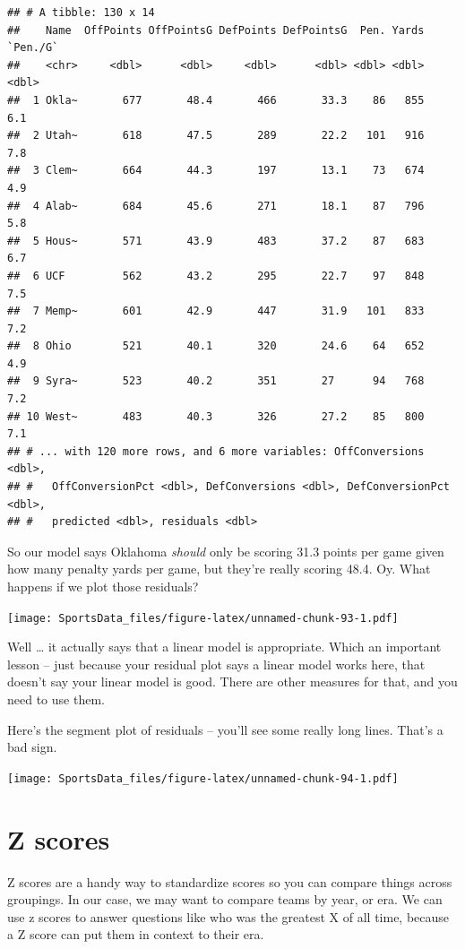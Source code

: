 \documentclass[]{book}
\begin{document}
\begin{verbatim}
## # A tibble: 130 x 14
##    Name  OffPoints OffPointsG DefPoints DefPointsG  Pen. Yards `Pen./G`
##    <chr>     <dbl>      <dbl>     <dbl>      <dbl> <dbl> <dbl>    <dbl>
##  1 Okla~       677       48.4       466       33.3    86   855      6.1
##  2 Utah~       618       47.5       289       22.2   101   916      7.8
##  3 Clem~       664       44.3       197       13.1    73   674      4.9
##  4 Alab~       684       45.6       271       18.1    87   796      5.8
##  5 Hous~       571       43.9       483       37.2    87   683      6.7
##  6 UCF         562       43.2       295       22.7    97   848      7.5
##  7 Memp~       601       42.9       447       31.9   101   833      7.2
##  8 Ohio        521       40.1       320       24.6    64   652      4.9
##  9 Syra~       523       40.2       351       27      94   768      7.2
## 10 West~       483       40.3       326       27.2    85   800      7.1
## # ... with 120 more rows, and 6 more variables: OffConversions <dbl>,
## #   OffConversionPct <dbl>, DefConversions <dbl>, DefConversionPct <dbl>,
## #   predicted <dbl>, residuals <dbl>
\end{verbatim}

So our model says Oklahoma \emph{should} only be scoring 31.3 points per
game given how many penalty yards per game, but they're really scoring
48.4. Oy. What happens if we plot those residuals?

\texttt{[image: SportsData\_files/figure-latex/unnamed-chunk-93-1.pdf]}

Well \ldots{} it actually says that a linear model is appropriate. Which
an important lesson -- just because your residual plot says a linear
model works here, that doesn't say your linear model is good. There are
other measures for that, and you need to use them.

Here's the segment plot of residuals -- you'll see some really long
lines. That's a bad sign.

\texttt{[image: SportsData\_files/figure-latex/unnamed-chunk-94-1.pdf]}

\chapter{Z scores}\label{z-scores}

Z scores are a handy way to standardize scores so you can compare things
across groupings. In our case, we may want to compare teams by year, or
era. We can use z scores to answer questions like who was the greatest X
of all time, because a Z score can put them in context to their era.
\end{document}
